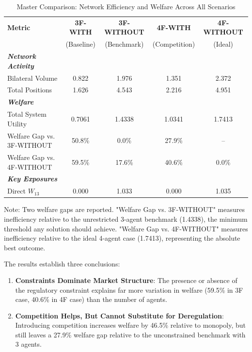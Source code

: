 \begin{table}[h]
\centering
\caption{Master Comparison: Network Efficiency and Welfare Across All Scenarios}
\label{tab:master_summary}
\begin{tabular}{lcccc}
\hline
\textbf{Metric} & \textbf{3F-WITH} & \textbf{3F-WITHOUT} & \textbf{4F-WITH} & \textbf{4F-WITHOUT} \\ 
 & (Baseline) & (Benchmark) & (Competition) & (Ideal) \\ \hline
\textit{\textbf{Network Activity}} & & & & \\
Bilateral Volume & 0.822 & 1.976 & 1.351 & 2.372 \\
Total Positions & 1.626 & 4.543 & 2.216 & 4.951 \\
\hline
\textit{\textbf{Welfare}} & & & & \\
Total System Utility & 0.7061 & 1.4338 & 1.0341 & 1.7413 \\
Welfare Gap vs. 3F-WITHOUT & 50.8\% & 0.0\% & 27.9\% & -- \\
Welfare Gap vs. 4F-WITHOUT & 59.5\% & 17.6\% & 40.6\% & 0.0\% \\
\hline
\textit{\textbf{Key Exposures}} & & & & \\
Direct $W_{13}$ & 0.000 & 1.033 & 0.000 & 1.035 \\
\hline
\end{tabular}
\begin{tablenotes}
\small
\item Note: Two welfare gaps are reported. "Welfare Gap vs. 3F-WITHOUT" measures inefficiency relative to the unrestricted 3-agent benchmark (1.4338), the minimum threshold any solution should achieve. "Welfare Gap vs. 4F-WITHOUT" measures inefficiency relative to the ideal 4-agent case (1.7413), representing the absolute best outcome.
\end{tablenotes}
\end{table}


The results establish three conclusions:

\begin{enumerate}
    \item \textbf{Constraints Dominate Market Structure}: The presence or absence of the regulatory constraint explains far more variation in welfare (59.5\% in 3F case, 40.6\% in 4F case) than the number of agents.
    
    \item \textbf{Competition Helps, But Cannot Substitute for Deregulation}: Introducing competition increases welfare by 46.5\% relative to monopoly, but still leaves a 27.9\% welfare gap relative to the unconstrained benchmark with 3 agents.
\end{enumerate}


